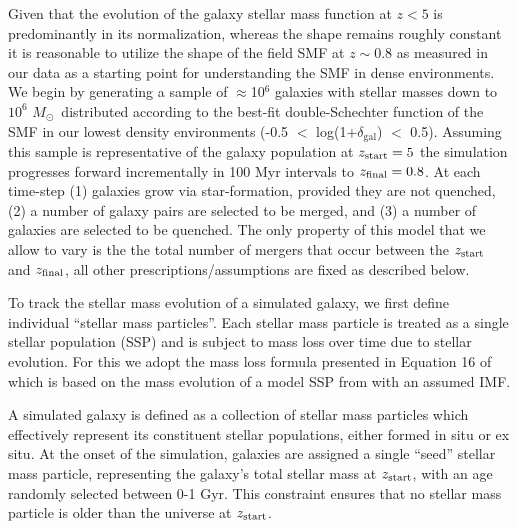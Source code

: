 \documentclass[a4paper,fleqn,usenatbib]{mnras}
\def\msol{$M_{\odot}$}
\begin{document}
Given that the evolution of the galaxy stellar mass function at $z<5$ is predominantly in its normalization, whereas the shape remains roughly constant \citep[e.g.][]{Ilbert2013, Tomczak2014, Grazian2015, Mortlock2015} it is reasonable to utilize the shape of the field SMF at $z\sim0.8$ as measured in our data as a starting point for understanding the SMF in dense environments.
We begin by generating a sample of $\approx$10$^6$ galaxies with stellar masses down to $10^6$ \msol\ distributed according to the best-fit double-Schechter function of the SMF in our lowest density environments (-0.5 $<$ log(1+$\delta_{\mathrm{gal}}$) $<$ 0.5).
Assuming this sample is representative of the galaxy population at $z_{\rm{start}}=5$ the simulation progresses forward incrementally in 100 Myr intervals to $z_{\rm{final}}=0.8$.
At each time-step (1) galaxies grow via star-formation, provided they are not quenched, (2) a number of galaxy pairs are selected to be merged, and (3) a number of galaxies are selected to be quenched.
The only property of this model that we allow to vary is the the total number of mergers that occur between the $z_{\rm{start}}$ and $z_{\rm{final}}$, all other prescriptions/assumptions are fixed as described below.




To track the stellar mass evolution of a simulated galaxy, we first define individual ``stellar mass particles''.
Each stellar mass particle is treated as a single stellar population (SSP) and is subject to mass loss over time due to stellar evolution.
For this we adopt the mass loss formula presented in Equation 16 of \citet{Moster2013} which is based on the mass evolution of a model SSP from \citet{Bruzual2003} with an assumed \citet{Chabrier2003} IMF.


A simulated galaxy is defined as a collection of stellar mass particles which effectively represent its constituent stellar populations, either formed in situ or ex situ.
At the onset of the simulation, galaxies are assigned a single ``seed'' stellar mass particle, representing the galaxy's total stellar mass at $z_{\rm{start}}$, with an age randomly selected between 0-1 Gyr.
This constraint ensures that no stellar mass particle is older than the universe at $z_{\rm{start}}$.


\end{document}
